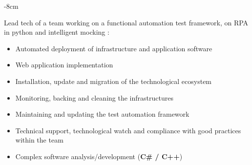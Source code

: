 \documentclass[10pt,a4paper]{altacv}
\begin{document}

\begin{adjustwidth}{}{-8cm}
\makecvheader
\end{adjustwidth}


\divider



Lead tech of a team working on a functional automation test framework, on RPA in python and intelligent mocking :
\medskip
\begin{itemize}
    \item Automated deployment of infrastructure and application software
    \item Web application implementation
    \item Installation, update and migration of the technological ecosystem 
    \item Monitoring, backing and cleaning the infrastructures  
    \item Maintaining and updating the test automation framework 
    \item Technical support, technological watch and compliance with good practices within the team 
\end{itemize}

\divider

\begin{itemize}
\item Complex software analysis/development (\textbf{C\# / C++})
\end{itemize}
\end{document}
